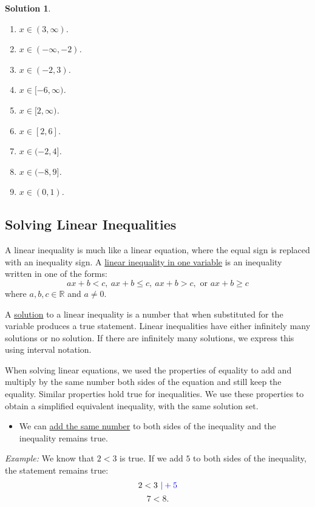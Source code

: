 \documentclass[12pt]{article}
\newtheorem{sol}[prop]{Solution}
\begin{document}
\begin{sol}
\begin{multicols}{2}
\begin{enumerate}
\item[a)] $x\in (3,\infty)$.
\item[b)] $x\in (-\infty,-2)$.
\item[c)] $x\in (-2,3)$.
\item[d)]$x\in [-6,\infty)$.
\item[e)] $x\in [2,\infty)$.
\item[f)] $x\in [2,6]$.
\item[g)] $x\in (-2,4]$.
\item[h)] $x\in (-8,9]$.
\item[i)] $x\in (0,1)$.
\end{enumerate}
\end{multicols}
\end{sol}

\subsection{Solving Linear Inequalities}
A linear inequality is much like a linear equation, where the equal sign is replaced with an inequality sign. A \underline{linear inequality in one variable} is an inequality written in one of the forms:
$$ ax+b<c, \ ax+b\leq c, \ ax+b>c, \text{ or }ax+b\geq c $$
where $a, b, c\in \mathbb{R}$ and $a\neq 0$.

A \underline{solution} to a linear inequality is a number that when substituted for the variable produces a true statement. Linear inequalities have either infinitely many solutions or no solution. If there are infinitely many solutions, we express this using interval notation.

When solving linear equations, we used the properties of equality to add and multiply by the same number both sides of the equation and still keep the equality. Similar properties hold true for inequalities. We use these properties to obtain a simplified equivalent inequality, with the same solution set.

\begin{itemize}
\item We can \underline{add the same number} to both sides of the inequality and the inequality remains true.
\end{itemize}

\textit{Example:} We know that $2<3$ is true. If we add $5$ to both sides of the inequality, the statement remains true:
$$2<3 \textcolor{blue}{\ |+5}$$
$$7<8.$$
\end{document}
